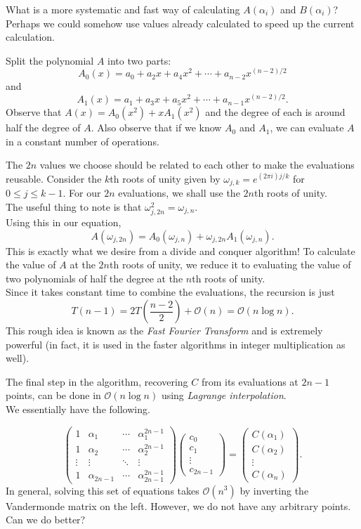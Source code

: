 What is a more systematic and fast way of calculating $A(\alpha_i)$ and $B(\alpha_i)$? Perhaps we could somehow use values already calculated to speed up the current calculation.

Split the polynomial $A$ into two parts:
\[ A_0(x) = a_0 + a_2x + a_4x^2 + \cdots + a_{n-2} x^{(n-2)/2} \]
and
\[ A_1(x) = a_1 + a_3x + a_5x^2 + \cdots + a_{n-1}x^{(n-2)/2}. \]
Observe that $A(x)=A_0(x^2)+xA_1(x^2)$ and the degree of each is around half the degree of $A$. Also observe that if we know $A_0$ and $A_1$, we can evaluate $A$ in a constant number of operations. 

The $2n$ values we choose should be related to each other to make the evaluations reusable. Consider the $k$th roots of unity given by $\omega_{j,k}=e^{(2\pi i)j/k}$ for $0\leq j\leq k-1$. For our $2n$ evaluations, we shall use the $2n$th roots of unity.\\
The useful thing to note is that $\omega_{j,2n}^2 = \omega_{j,n}$.\\

Using this in our equation,
\[ A(\omega_{j,2n}) = A_0(\omega_{j,n}) + \omega_{j,2n} A_1(\omega_{j,n}). \]
This is exactly what we desire from a divide and conquer algorithm! To calculate the value of $A$ at the $2n$th roots of unity, we reduce it to evaluating the value of two polynomials of half the degree at the $n$th roots of unity.\\
Since it takes constant time to combine the evaluations, the recursion is just
\[ T(n-1) = 2T\left(\frac{n-2}{2}\right) + \mathcal{O}(n) = \mathcal{O}(n\log n). \]
This rough idea is known as the \textit{Fast Fourier Transform} and is extremely powerful (in fact, it is used in the faster algorithms in integer multiplication as well).

The final step in the algorithm, recovering $C$ from its evaluations at $2n-1$ points, can be done in $\mathcal{O}(n\log n)$ using \textit{Lagrange interpolation}.\\

We essentially have the following.

\[
	\begin{pmatrix}
		1 & \alpha_1 & \cdots & \alpha_1^{2n-1} \\
		1 & \alpha_2 & \cdots & \alpha_2^{2n-1} \\
		\vdots & \vdots & \ddots & \vdots \\
		1 & \alpha_{2n-1} & \cdots & \alpha_{2n-1}^{2n-1}
	\end{pmatrix}
	\begin{pmatrix}
		c_0 \\
		c_1 \\
		\vdots \\
		c_{2n-1}
	\end{pmatrix}
	=
	\begin{pmatrix}
		C(\alpha_1) \\
		C(\alpha_2) \\
		\vdots \\
		C(\alpha_n)
	\end{pmatrix}
	.
\]
In general, solving this set of equations takes $\mathcal{O}(n^3)$ by inverting the Vandermonde matrix on the left. However, we do not have any arbitrary points. Can we do better?

